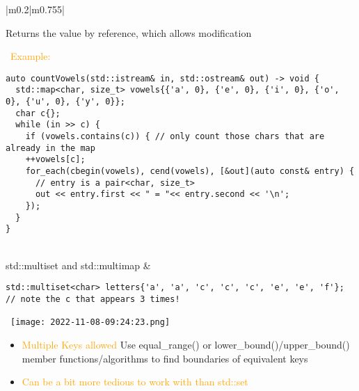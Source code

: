 \documentclass[main.tex,fontsize=8pt,paper=a4,paper=portrait,DIV=calc,]{scrartcl}
\begin{document}
\begin{table}[ht!]
\begin{tabular}{|m{0.2\linewidth}|m{0.755\linewidth}|}
\begin{itemize}
  Returns the value by reference, which allows modification
\vspace{-2mm}
\end{itemize} 
\, \newline
\textcolor{orange}{Example:}\newline
\begin{lstlisting}
auto countVowels(std::istream& in, std::ostream& out) -> void {
  std::map<char, size_t> vowels{{'a', 0}, {'e', 0}, {'i', 0}, {'o', 0}, {'u', 0}, {'y', 0}};
  char c{};
  while (in >> c) {
    if (vowels.contains(c)) { // only count those chars that are already in the map
    ++vowels[c];
    for_each(cbegin(vowels), cend(vowels), [&out](auto const& entry) {
      // entry is a pair<char, size_t>
      out << entry.first << " = "<< entry.second << '\n';
    });
  }
}
\end{lstlisting}\\
\hline
std::multiset and std::multimap & 
\begin{lstlisting}
std::multiset<char> letters{'a', 'a', 'c', 'c', 'c', 'e', 'e', 'f'};
// note the c that appears 3 times!
\end{lstlisting}
\, \newline
\texttt{[image: 2022-11-08-09:24:23.png]}\newline
\begin{itemize}
\item \textcolor{orange}{Multiple Keys allowed}\newline
  Use equal\_range() or lower\_bound()/upper\_bound() member functions/algorithms to find boundaries of equivalent keys
\item \textcolor{orange}{Can be a bit more tedious to work with than std::set}
\vspace{-2mm}
\end{itemize} \\
\hline
\end{tabular}
\end{table}
\pagebreak
\end{document}
